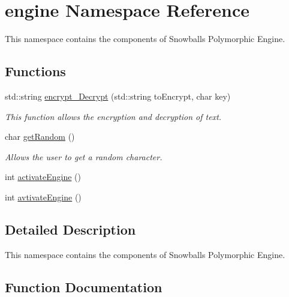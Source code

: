 \hypertarget{namespaceengine}{}\section{engine Namespace Reference}
\label{namespaceengine}


This namespace contains the components of Snowball\textquotesingle{}s Polymorphic Engine.  


\subsection*{Functions}
\begin{DoxyCompactItemize}
\item 
std\+::string \hyperlink{namespaceengine_a809f71235f1a2a58ea738d4276b795c9}{encrypt\+\_\+\+Decrypt} (std\+::string to\+Encrypt, char key)
\begin{DoxyCompactList}\small\item\em This function allows the encryption and decryption of text. \end{DoxyCompactList}\item 
char \hyperlink{namespaceengine_afdfa37a571a13db9a156c8a6813fa3e5}{get\+Random} ()
\begin{DoxyCompactList}\small\item\em Allows the user to get a random character. \end{DoxyCompactList}\item 
int \hyperlink{namespaceengine_ab21d578e4ee601aded70f695f8543d22}{activate\+Engine} ()
\item 
int \hyperlink{namespaceengine_a640e5ff4dec2d87df4ea2243128e33c8}{avtivate\+Engine} ()
\end{DoxyCompactItemize}


\subsection{Detailed Description}
This namespace contains the components of Snowball\textquotesingle{}s Polymorphic Engine. 

\subsection{Function Documentation}
\mbox{\label{namespaceengine_ab21d578e4ee601aded70f695f8543d22}} 

